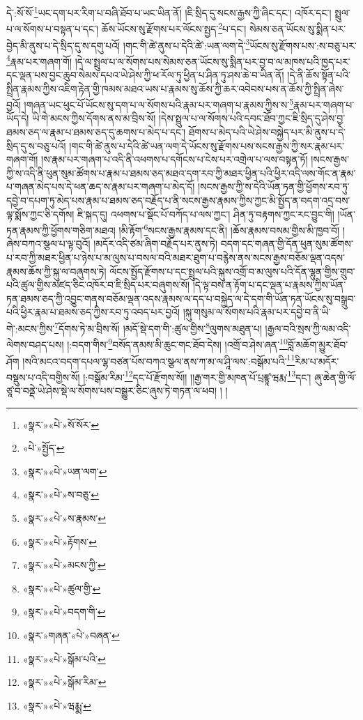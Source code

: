 དེ་:སོ་སོ་\footnote{«སྣར་»«པེ་»སོ་སོར་}ཡང་དག་པར་རིག་པ་བཞི་ཐོབ་པ་ཡང་ཡིན་ནོ། །ཇི་སྲིད་དུ་སངས་རྒྱས་ཀྱི་ཞིང་དང་། འཁོར་དང་། སྤྲུལ་པ་ལ་སོགས་པ་བསྟན་པ་དང་། ཆོས་ཡོངས་སུ་རྫོགས་པར་ལོངས་སྤྱད་\footnote{«པེ་»སྤྱོད་}པ་དང་། སེམས་ཅན་ཡོངས་སུ་སྨིན་པར་བྱེད་མི་ནུས་པ་དེ་སྲིད་དུ་ས་དགུ་པའོ། །གང་གི་ཚེ་ནུས་པ་དེའི་ཚེ་:ཡན་ལག་དེ་\footnote{«སྣར་»«པེ་»ཡན་ལག་}ཡོངས་སུ་རྫོགས་པས་:ས་བཅུ་པར་\footnote{«སྣར་»«པེ་»ས་བཅུ་}རྣམ་པར་གཞག་གོ། །དེ་ལ་སྤྲུལ་པ་ལ་སོགས་པས་སེམས་ཅན་ཡོངས་སུ་སྨིན་པར་བྱ་བ་ལ་མཁས་པའི་ཁྱད་པར་དང་ལྡན་པས་བྱང་ཆུབ་སེམས་དཔའ་ཡེ་ཤེས་ཀྱི་ཕ་རོལ་ཏུ་ཕྱིན་པ་ཤིན་ཏུ་ཤས་ཆེ་བ་ཡིན་ནོ། །དེ་ནི་ཆོས་སྟོན་པའི་སྤྲིན་རྣམས་ཀྱིས་འཇིག་རྟེན་གྱི་ཁམས་མཐའ་ཡས་པ་རྣམས་སུ་ཆོས་ཀྱི་ཆར་འབེབས་པས་ན་ཆོས་ཀྱི་སྤྲིན་ཞེས་བྱའོ། །གཞན་ཡང་ཕུང་པོ་ཡོངས་སུ་དག་པ་ལ་སོགས་པའི་རྣམ་པར་གཞག་པ་རྣམས་ཀྱིས་ས་\footnote{«སྣར་»«པེ་»ས་རྣམས་}རྣམ་པར་གཞག་པ་ཡོད་དེ། ཡི་གེ་མངས་ཀྱིས་དོགས་ནས་མ་བྲིས་སོ། །དེས་སྤྲུལ་པ་ལ་སོགས་པའི་དབང་ཐོབ་ཀྱང་ཇི་སྲིད་དུ་ཤེས་བྱ་ཐམས་ཅད་ལ་རྣམ་པ་ཐམས་ཅད་དུ་ཆགས་པ་མེད་པ་དང་། ཐོགས་པ་མེད་པའི་ཡེ་ཤེས་བསྐྱེད་པར་མི་ནུས་པ་དེ་སྲིད་དུ་ས་བཅུ་པའོ། །གང་གི་ཚེ་ནུས་པ་དེའི་ཚེ་ཡན་ལག་དེ་ཡོངས་སུ་རྫོགས་པས་སངས་རྒྱས་ཀྱི་སར་རྣམ་པར་གཞག་གོ། །ས་རྣམ་པར་གཞག་པ་འདི་ནི་འཕགས་པ་དགོངས་པ་ངེས་པར་འགྲེལ་པ་ལས་བསྟན་ཏོ། །སངས་རྒྱས་ཀྱི་ས་འདི་ནི་ཕུན་སུམ་ཚོགས་པ་རྣམ་པ་ཐམས་ཅད་མཐའ་དག་རབ་ཀྱི་མཐར་ཕྱིན་པའི་ཕྱིར་འདི་ལས་གོང་ན་རྣམ་པ་གཞན་མེད་པས་དེ་ཕན་ཆད་ས་རྣམ་པར་གཞག་པ་མེད་དོ། །སངས་རྒྱས་ཀྱི་ས་དེའི་ཡོན་ཏན་གྱི་ཕྱོགས་རབ་ཏུ་དབྱེ་བ་དཔག་ཏུ་མེད་པས་རྣམ་པ་ཐམས་ཅད་བརྗོད་པ་ནི་སངས་རྒྱས་རྣམས་ཀྱིས་ཀྱང་མི་སྤྱོད་ན་བདག་འདྲ་བས་ལྟ་སྨོས་ཀྱང་ཅི་དགོས། ཇི་སྐད་དུ། འཕགས་པ་སྡོང་པོ་བཀོད་པ་ལས་ཀྱང་། ཤིན་ཏུ་བརྟགས་ཀྱང་རང་བྱུང་གི། །ཡོན་ཏན་རྣམས་ཀྱི་ཕྱོགས་གཅིག་མཐའ། །མི་རྟོག་\footnote{«སྣར་»«པེ་»རྟོགས་}སངས་རྒྱས་རྣམས་དང་ནི། །ཆོས་རྣམས་བསམ་གྱིས་མི་ཁྱབ་བོ། །ཞེས་བཀའ་སྩལ་པ་ལྟ་བུའོ། །མདོར་འདི་ཙམ་ཞིག་བརྗོད་པར་ནུས་ཏེ། བདག་དང་གཞན་གྱི་དོན་ཕུན་སུམ་ཚོགས་པ་རབ་ཀྱི་མཐར་ཕྱིན་པ་ཉེས་པ་མ་ལུས་པ་བསལ་བའི་མཐར་ཐུག་པ་བརྙེས་ནས་སངས་རྒྱས་བཅོམ་ལྡན་འདས་རྣམས་ཆོས་ཀྱི་སྐུ་ལ་བཞུགས་ཏེ། ལོངས་སྤྱོད་རྫོགས་པ་དང་སྤྲུལ་པའི་སྐུས་འགྲོ་བ་མ་ལུས་པའི་དོན་ལྷུན་གྱིས་གྲུབ་པའི་ཚུལ་གྱིས་མཛད་ཅིང་འཁོར་བ་ཇི་སྲིད་པར་བཞུགས་སོ། །དེ་ལྟ་བས་ན་རྟོག་པ་དང་ལྡན་པ་རྣམས་ཀྱིས་ཡོན་ཏན་ཐམས་ཅད་ཀྱི་འབྱུང་གནས་བཅོམ་ལྡན་འདས་རྣམས་ལ་དད་པ་བསྐྱེད་ལ་དེ་དག་གི་ཡོན་ཏན་ཡོངས་སུ་བསྒྲུབ་པའི་ཕྱིར་རྣམ་པ་ཐམས་ཅད་ཀྱིས་རབ་ཏུ་འབད་པར་བྱའོ། །སྐུ་གསུམ་ལ་སོགས་པའི་རྣམ་པར་དབྱེ་བ་ནི་ཡི་གེ་:མངས་ཀྱིས་\footnote{«སྣར་»«པེ་»མངས་ཀྱི་}དོགས་ཏེ་མ་བྲིས་སོ། །མདོ་སྡེ་དག་གི་:ཚུལ་གྱིས་\footnote{«སྣར་»«པེ་»ཚུལ་གྱི་}ལུགས་མཐུན་པ། །རྒྱལ་བའི་སྲས་ཀྱི་ལམ་འདི་ལེགས་བཤད་པས། །:བདག་གིས་\footnote{«སྣར་»«པེ་»བདག་གི་}བསོད་ནམས་མི་ཆུང་གང་ཐོབ་དེས། །འགྲོ་བ་ཤེས་ཞན་\footnote{«སྣར་»གཞན་«པེ་»བཞན་}བློ་མཆོག་མྱུར་ཐོབ་ཤོག །སའི་མངའ་བདག་དཔལ་ལྷ་བཙན་པོས་བཀའ་སྩལ་ནས་ཀ་མ་ལ་ཤཱི་ལས་:བསྒོམ་པའི་\footnote{«སྣར་»«པེ་»སྒོམ་པའི་}རིམ་པ་མདོར་བསྡུས་པ་འདི་བགྱིས་སོ། །:བསྒོམ་རིམ་\footnote{«སྣར་»«པེ་»སྒོམ་རིམ་}དང་པོ་རྫོགས་སོ།། །།རྒྱ་གར་གྱི་མཁན་པོ་པྲཛྙཱ་ཝརྨ་\footnote{«སྣར་»«པེ་»ཝརྨྨ་}དང་། ཞུ་ཆེན་གྱི་ལོ་ཙཱ་བ་བནྡེ་ཡེ་ཤེས་སྡེ་ལ་སོགས་པས་བསྒྱུར་ཅིང་ཞུས་ཏེ་གཏན་ལ་ཕབ། ། །